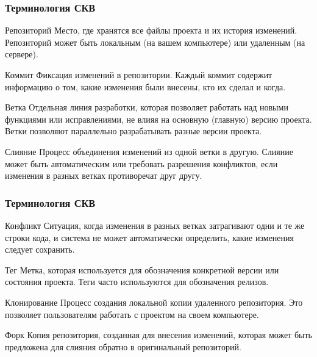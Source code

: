 \documentclass[aspectratio=169]{beamer}
\begin{document}
\begin{frame}
\frametitle{Терминология СКВ}
\begin{alertblock}{Репозиторий}
Место, где хранятся все файлы проекта и их история изменений. Репозиторий может быть локальным (на вашем компьютере) или удаленным (на сервере).
\end{alertblock}
\begin{alertblock}{Коммит}
Фиксация изменений в репозитории. Каждый коммит содержит информацию о том, какие изменения были внесены, кто их сделал и когда.
\end{alertblock}
\begin{alertblock}{Ветка}
Отдельная линия разработки, которая позволяет работать над новыми функциями или исправлениями, не влияя на основную (главную) версию проекта. Ветки позволяют параллельно разрабатывать разные версии проекта.
\end{alertblock}
\begin{alertblock}{Слияние}
Процесс объединения изменений из одной ветки в другую. Слияние может быть автоматическим или требовать разрешения конфликтов, если изменения в разных ветках противоречат друг другу.
\end{alertblock}
\end{frame}

\begin{frame}
\frametitle{Терминология СКВ}
\begin{alertblock}{Конфликт}
Ситуация, когда изменения в разных ветках затрагивают одни и те же строки кода, и система не может автоматически определить, какие изменения следует сохранить.
\end{alertblock}
\begin{alertblock}{Тег}
Метка, которая используется для обозначения конкретной версии или состояния проекта. Теги часто используются для обозначения релизов.
\end{alertblock}
\begin{alertblock}{Клонирование}
Процесс создания локальной копии удаленного репозитория. Это позволяет пользователям работать с проектом на своем компьютере.
\end{alertblock}
\begin{alertblock}{Форк}
Копия репозитория, созданная для внесения изменений, которая может быть предложена для слияния обратно в оригинальный репозиторий.
\end{alertblock}
\end{frame}
\end{document}
